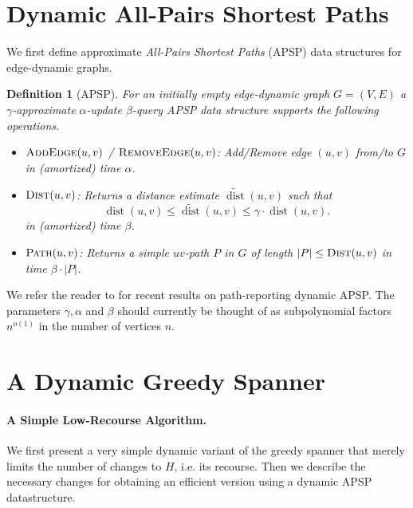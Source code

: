 \documentclass[11pt]{article}
\newtheorem{definition}[theorem]{Definition}
\DeclareMathOperator{\dist}{dist}
\begin{document}
\section{Dynamic All-Pairs Shortest Paths}

We first define approximate \emph{All-Pairs Shortest Paths} (APSP) data structures for edge-dynamic graphs. 

\begin{definition}[APSP] \label{def:apsp}
    For an initially empty edge-dynamic graph $G = (V, E)$ a $\gamma$-approximate $\alpha$-update $\beta$-query APSP data structure supports the following operations.
    \begin{itemize}
        \item $\textsc{AddEdge}(u,v)$ / $\textsc{RemoveEdge}(u, v)$: Add/Remove edge $(u, v)$ from/to $G$ in (amortized) time $\alpha$.
        \item $\textsc{Dist}(u, v)$: Returns a distance estimate $\widetilde{\dist}(u,v)$ such that
        \begin{equation*}
            \dist(u, v) \leq \widetilde{\dist}(u,v) \leq \gamma \cdot \dist(u,v). 
        \end{equation*}
        in (amortized) time $\beta$.
        \item $\textsc{Path}(u,v)$: Returns a simple $uv$-path $P$ in $G$ of length $|P| \leq \textsc{Dist}(u,v)$ in time $\beta \cdot |P|$. \end{itemize}
\end{definition}

We refer the reader to \cite{CZ23, kyng2023dynamic, haeupler2024dynamicdeterministicconstantapproximatedistance} for recent results on path-reporting dynamic APSP.
The parameters $\gamma, \alpha$ and $\beta$ should currently be thought of as subpolynomial factors $n^{o(1)}$ in the number of vertices $n$. 

\section{A Dynamic Greedy Spanner}

\paragraph{A Simple Low-Recourse Algorithm. }  We first present a very simple dynamic variant of the greedy spanner that merely limits the number of changes to $H$, i.e. its recourse. Then we describe the necessary changes for obtaining an efficient version using a dynamic APSP datastructure. 
\end{document}
